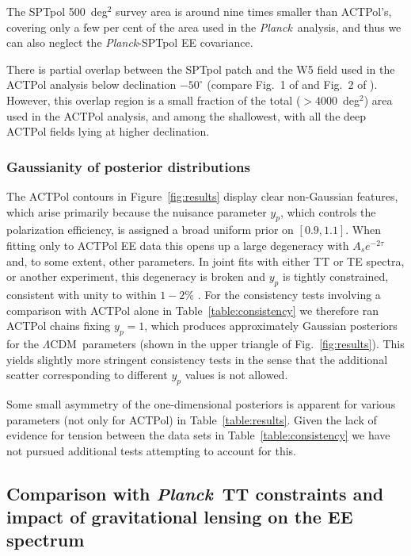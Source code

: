 \documentclass[twocolumn]{aastex63}
\newcommand{\wmap}{\textsl{WMAP}}
\newcommand{\planck}{\textsl{Planck}}
\newcommand{\lcdm}{\ensuremath{\Lambda\mathrm{CDM}}}
\begin{document}
The SPTpol 500~deg$^2$ survey area is around nine times smaller than ACTPol's, covering only a few per cent of the area used in the \planck\ analysis, and thus we can also neglect the \planck-SPTpol EE covariance.

There is partial overlap between the SPTpol patch and the W5 field used in the ACTPol analysis below declination $-50^{\circ}$ (compare Fig.~1 of \citealt{henning/etal:2018} and Fig.~2 of \citealt{choi/etal:2020}). However, this overlap region is a small fraction of the total ($>4000$~deg$^2$) area used in the ACTPol analysis, and among the shallowest, with all the deep ACTPol fields lying at higher declination.

\subsubsection{Gaussianity of posterior distributions}
\label{sec:resultsconsistencygauss}

The ACTPol contours in Figure~\ref{fig:results} display clear non-Gaussian features, which arise primarily because the nuisance parameter $y_p$, which controls the polarization efficiency, is assigned a broad uniform prior on $[0.9,1.1]$. When fitting only to ACTPol EE data this opens up a large degeneracy with $A_se^{-2\tau}$ and, to some extent, other parameters. In joint fits with either TT or TE spectra, or another experiment, this degeneracy is broken and $y_p$ is tightly constrained, consistent with unity to within $1-2\%$ \citep[See Table~4 of][for results from joint fits to ACTPol and \wmap\ or \planck]{aiola/etal:2020}. For the consistency tests involving a comparison with ACTPol alone in Table~\ref{table:consistency} we therefore ran ACTPol chains fixing $y_p=1$, which produces approximately Gaussian posteriors for the \lcdm\ parameters (shown in the upper triangle of Fig.~\ref{fig:results}). This yields slightly more stringent consistency tests in the sense that the additional scatter corresponding to different $y_p$ values is not allowed.

Some small asymmetry of the one-dimensional posteriors is apparent for various parameters (not only for ACTPol) in Table~\ref{table:results}. Given the lack of evidence for tension between the data sets in Table~\ref{table:consistency} we have not pursued additional tests attempting to account for this.

\subsection{Comparison with \planck\ TT constraints and impact of gravitational lensing on the EE spectrum}
\label{sec:resultsplancktt}
\end{document}
